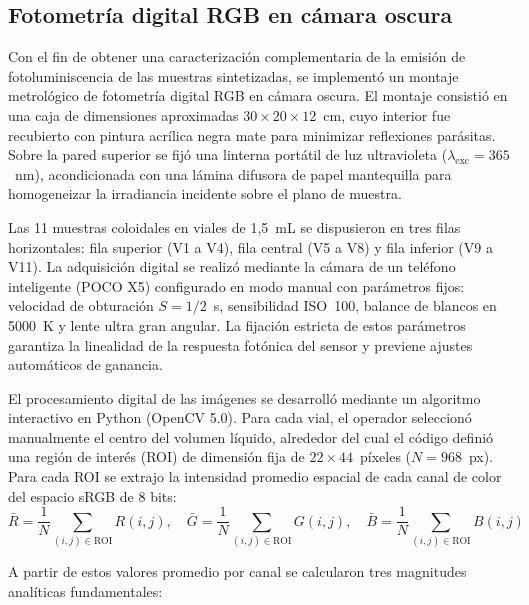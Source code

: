 \subsection{Fotometría digital RGB en cámara oscura}

Con el fin de obtener una caracterización complementaria de la emisión de fotoluminiscencia de las muestras 
sintetizadas, se implementó un montaje metrológico de fotometría digital RGB en cámara oscura. El montaje consistió en una caja de dimensiones aproximadas $30 \times 20 \times 12$~cm, cuyo interior fue recubierto con pintura acrílica negra mate para minimizar reflexiones parásitas. Sobre la pared superior se fijó una linterna portátil de luz ultravioleta ($\lambda_{\text{exc}} = 365$~nm), acondicionada con una lámina difusora de papel mantequilla para homogeneizar la irradiancia incidente sobre el plano de muestra.

Las 11 muestras coloidales en viales de 1,5~mL se dispusieron en tres filas horizontales: fila superior (V1 a V4), fila central (V5 a V8) y fila inferior (V9 a V11). La adquisición digital se realizó mediante la cámara de un teléfono inteligente (POCO X5) configurado en modo manual con parámetros fijos: velocidad de obturación $S = 1/2$~s, sensibilidad ISO~100, balance de blancos en 5000~K y lente ultra gran angular. La fijación estricta de estos parámetros garantiza la linealidad de la respuesta fotónica del sensor y previene ajustes automáticos de ganancia.

El procesamiento digital de las imágenes se desarrolló mediante un algoritmo interactivo en Python (OpenCV 5.0). Para cada vial, el operador seleccionó manualmente el centro del volumen líquido, alrededor del cual el código definió una región de interés (ROI) de dimensión fija de $22 \times 44$~píxeles ($N = 968$~px). Para cada ROI se extrajo la intensidad promedio espacial de cada canal de color del espacio sRGB de 8 bits:
\begin{equation}
    \bar{R} = \frac{1}{N}\sum_{(i,j)\in\text{ROI}} R(i,j), \quad 
    \bar{G} = \frac{1}{N}\sum_{(i,j)\in\text{ROI}} G(i,j), \quad 
    \bar{B} = \frac{1}{N}\sum_{(i,j)\in\text{ROI}} B(i,j)
\end{equation}

A partir de estos valores promedio por canal se calcularon tres magnitudes analíticas fundamentales:

